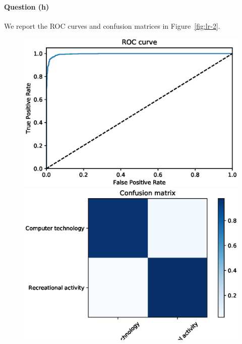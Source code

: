 \documentclass[letterpaper]{article}
\begin{document}
\paragraph{Question (h)}
We report the ROC curves and confusion matrices in Figure~\ref{fig:lr-2}.
\begin{figure}[!htb]
\centering
\begin{minipage}{0.5\textwidth}
\includegraphics[width=1.0\textwidth]{roc-lsi-log-reg}
\end{minipage}%
\begin{minipage}{0.5\textwidth}
\includegraphics[width=1.0\textwidth]{conf-mat-lsi-log-reg}
\end{minipage}
\begin{minipage}{0.5\textwidth}

\end{minipage}
\end{figure}
\end{document}
